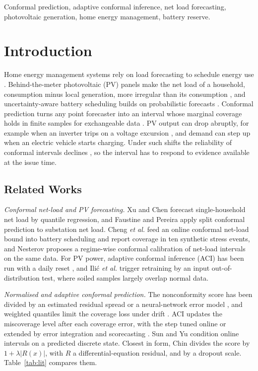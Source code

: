 \documentclass[conference,a4paper]{IEEEtran}
\begin{document}
\begin{IEEEkeywords}
Conformal prediction, adaptive conformal inference, net load forecasting, photovoltaic generation, home
energy management, battery reserve.
\end{IEEEkeywords}

\section{Introduction}
Home energy management systems rely on load forecasting to schedule energy use \cite{raza}. Behind-the-meter photovoltaic (PV)
panels make the net load of a household, consumption minus local generation, more irregular than its consumption
\cite{xuchen}, and uncertainty-aware battery scheduling builds on probabilistic forecasts \cite{sesay}. Conformal
prediction turns any point forecaster into an interval whose marginal coverage holds in finite samples for
exchangeable data \cite[Thm.~2.2]{lei}. PV output can drop abruptly, for example when an inverter trips on a
voltage excursion \cite[Sec.~I]{dehghanpour}, and demand can step up when an electric vehicle starts charging.
Under such shifts the reliability of conformal intervals declines \cite{ilic}, so the interval has to respond to
evidence available at the issue time.

\subsection{Related Works}
\emph{Conformal net-load and PV forecasting.} Xu and Chen \cite{xuchen} forecast single-household net load by
quantile regression, and Faustine and Pereira \cite[Sec.~II-A]{faustine} apply split
conformal prediction to substation net load. Cheng \emph{et al.} \cite{cheng} feed an online conformal net-load
bound into battery scheduling and report coverage in ten synthetic stress events, and Nesterov \cite{nesterov} proposes a regime-wise
conformal calibration of net-load intervals on the same data. For PV power, adaptive conformal
inference (ACI) has been run with a daily reset \cite{suresh}, and Ili\'c \emph{et al.} \cite{ilic} trigger retraining by an
input out-of-distribution test, where soiled samples largely overlap normal data.

\emph{Normalised and adaptive conformal prediction.} The nonconformity score has been divided by an estimated
residual spread \cite[Sec.~5.2]{lei} or a neural-network error model \cite[eq.~(16)]{papadopoulos11}, and weighted
quantiles limit the coverage loss under drift \cite[Sec.~3.1]{barber}. ACI \cite[eq.~(2)]{gibbs} updates the
miscoverage level after each coverage error, with the step tuned online \cite[Sec.~2.3]{gibbs24} or extended by
error integration and scorecasting \cite[Sec.~2]{angelopoulos}. Sun and Yu \cite{sunyu} condition online intervals
on a predicted discrete state. Closest in form, Chin \cite[eqs.~(2), (4)]{chin} divides the score by
$1+\lambda|R(x)|$, with $R$ a differential-equation residual, and by a dropout scale.
Table~\ref{tab:lit} compares them.
\end{document}
